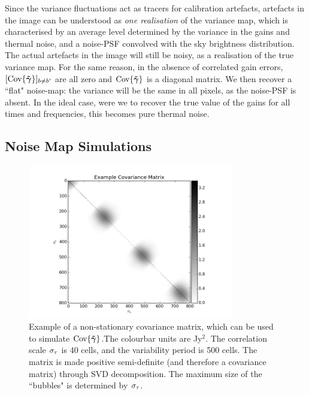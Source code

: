 {Since the variance fluctuations act as tracers for calibration artefacts, artefacts in the image can be understood as \emph{one realisation} of the variance map, which is characterised by an average level determined by the variance in the gains and thermal noise, and a noise-PSF convolved with the sky brightness distribution}. The actual artefacts in the image will still be noisy, as a realisation of the true variance map. For the same reason, in the absence of correlated gain errors, $[\textrm{Cov}\{\bm{\tilde{\gamma}}\}]_{b \ne b'}$ are all zero and $\textrm{Cov}\{\bm{\tilde{\gamma}}\}$ is a diagonal matrix. {We then recover a ``flat" noise-map: the variance will be the same in all pixels, as the noise-PSF is absent}. In the ideal case, were we to recover the true value of the gains for all times and frequencies, this becomes pure thermal noise.
\subsection{Noise Map Simulations}\label{sec.simulations}



\begin{figure}[h!]
\centering
\includegraphics[width=0.8\textwidth]{images/CovarianceMatrix.png}
\caption{\label{fig.covmat} Example of {a non-stationary covariance matrix}, which can be used to simulate $\textrm{Cov}\{\bm{\tilde{\gamma}}\}$.{The colourbar units are Jy$^2$}. The correlation scale $\sigma_\tau$ is 40 cells, and the variability period is 500 cells. The matrix is made positive semi-definite (and therefore a covariance matrix) through SVD decomposition. The maximum size of the ``bubbles" is determined by $\sigma_\tau$.}
\end{figure}


